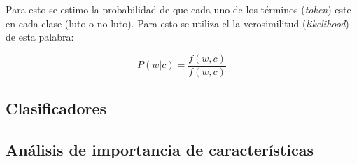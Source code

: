 Para esto se estimo la probabilidad de que cada uno de los términos (\textit{token}) este en cada clase (luto o no luto). Para esto se utiliza el la verosimilitud (\textit{likelihood}) de esta palabra: 

\begin{equation}
    P(w|c) = \frac{f(w,c)}{f(w,c)}
\end{equation}

\subsection{Clasificadores}


\subsection{Análisis de importancia de características}